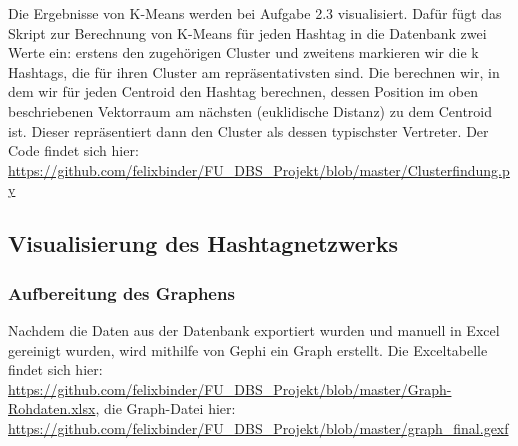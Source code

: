 \documentclass[BCOR0mm,fontsize=12pt,paper=a4,final,numbers=noenddot]{scrartcl}
\begin{document}
Die Ergebnisse von K-Means werden bei Aufgabe 2.3 visualisiert. Dafür fügt das Skript zur Berechnung von K-Means für jeden Hashtag in die Datenbank zwei Werte ein: erstens den zugehörigen Cluster und zweitens markieren wir die k Hashtags, die für ihren Cluster am repräsentativsten sind. Die berechnen wir, in dem wir für jeden Centroid den Hashtag berechnen, dessen Position im oben beschriebenen Vektorraum am nächsten (euklidische Distanz) zu dem Centroid ist. Dieser repräsentiert dann den Cluster als dessen typischster Vertreter. Der Code findet sich hier: \url{https://github.com/felixbinder/FU_DBS_Projekt/blob/master/Clusterfindung.py}

\subsection{Visualisierung des Hashtagnetzwerks}
\subsubsection{Aufbereitung des Graphens}
Nachdem die Daten aus der Datenbank exportiert wurden und manuell in Excel gereinigt wurden, wird mithilfe von Gephi ein Graph erstellt. Die Exceltabelle findet sich hier: \url{https://github.com/felixbinder/FU_DBS_Projekt/blob/master/Graph-Rohdaten.xlsx}, die Graph-Datei hier: \url{https://github.com/felixbinder/FU_DBS_Projekt/blob/master/graph_final.gexf}
\end{document}
